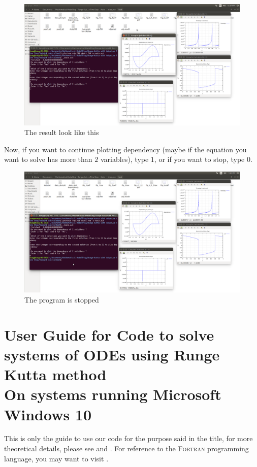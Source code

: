 \documentclass[a4paper,oneside]{book}
\numberwithin{equation}{chapter}
\begin{document}
	\begin{figure}[H]
		\centering	\includegraphics[width=15cm]{fig10}
		\caption{The result look like this}
	\end{figure}
	\noindent Now, if you want to continue plotting dependency (maybe if the equation you want to solve has more than $2$ variables), type $1$, or if you want to stop, type $0$.
	\begin{figure}[H]
		\centering	\includegraphics[width=15cm]{fig11}
		\caption{The program is stopped}
	\end{figure}




\chapter{User Guide for Code to solve systems of ODEs using Runge Kutta method\\On systems running Microsoft Windows 10}
This is only the guide to use our code for the purpose said in the title, for more theoretical details, please see \cite{user1} and \cite{user2}. For reference to the \textsc{Fortran} programming language, you may want to visit \cite{user3}.
\end{document}
